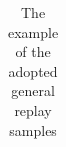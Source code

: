 \begin{table}[htbp]
{\begin{tabular}{c|c|c}
\bottomrule
\end{tabular}

}
\caption{The example of the adopted general replay samples}
\label{tab:detailed_gen_samples}
\end{table}


